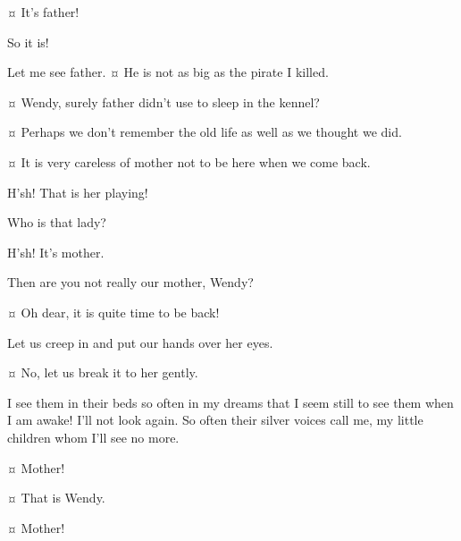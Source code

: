 \begin{drama}
\wendyspeaks {}¤
It's father!

\johnspeaks
So it is!

\michaelspeaks
Let me see father.
¤
He is not as big as the pirate I killed.

\johnspeaks {}¤
Wendy, surely father didn't use to sleep in the kennel?

\wendyspeaks {}¤
Perhaps we don't remember the old life as well as we thought we did.

\johnspeaks {}¤
It is very careless of mother not to be here when we come back.


\wendyspeaks
H'sh!
That is her playing!

\michaelspeaks
Who is that lady?

\johnspeaks
H'sh!
It's mother.

\michaelspeaks
Then are you not really our mother, Wendy?

\wendyspeaks {}¤
Oh dear, it is quite time to be back!

\johnspeaks
Let us creep in and put our hands over her eyes.

\wendyspeaks {}¤
No, let us break it to her gently.


\mrsdarlingspeaks
I see them in their beds so often in my dreams that I seem still to see them when I am awake!
I'll not look again.
So often their silver voices call me, my little children whom I'll see no more.


\wendyspeaks {}¤
Mother!

\mrsdarlingspeaks {}¤
That is Wendy.

\johnspeaks {}¤
Mother!


\end{drama}
